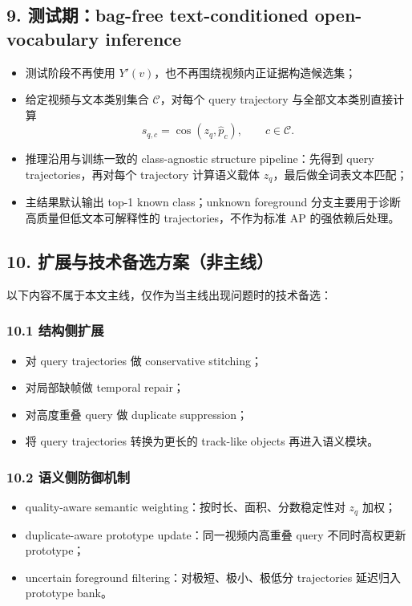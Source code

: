 \documentclass[UTF8]{ctexart}
\begin{document}
\subsection*{9. 测试期：bag-free text-conditioned open-vocabulary inference}
\begin{itemize}
\item 测试阶段不再使用 $Y'(v)$，也不再围绕视频内正证据构造候选集；
\item 给定视频与文本类别集合 $\mathcal C$，对每个 query trajectory 与全部文本类别直接计算
\[
 s_{q,c}=\cos(z_q,\hat p_c),\qquad c\in\mathcal C.
\]
\item 推理沿用与训练一致的 class-agnostic structure pipeline：先得到 query trajectories，再对每个 trajectory 计算语义载体 $z_q$，最后做全词表文本匹配；
\item 主结果默认输出 top-1 known class；unknown foreground 分支主要用于诊断高质量但低文本可解释性的 trajectories，不作为标准 AP 的强依赖后处理。
\end{itemize}

\par\noindent\hrulefill\par

\subsection*{10. 扩展与技术备选方案（非主线）}
以下内容不属于本文主线，仅作为当主线出现问题时的技术备选：

\subsubsection*{10.1 结构侧扩展}
\begin{itemize}
\item 对 query trajectories 做 conservative stitching；
\item 对局部缺帧做 temporal repair；
\item 对高度重叠 query 做 duplicate suppression；
\item 将 query trajectories 转换为更长的 track-like objects 再进入语义模块。
\end{itemize}

\subsubsection*{10.2 语义侧防御机制}
\begin{itemize}
\item quality-aware semantic weighting：按时长、面积、分数稳定性对 $z_q$ 加权；
\item duplicate-aware prototype update：同一视频内高重叠 query 不同时高权更新 prototype；
\item uncertain foreground filtering：对极短、极小、极低分 trajectories 延迟归入 prototype bank。
\end{itemize}
\end{document}

